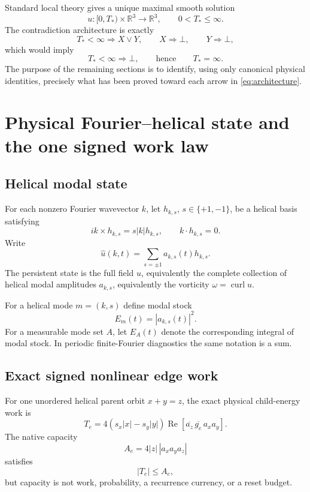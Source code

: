 \documentclass[11pt]{article}
\newcommand{\R}{\mathbb R}
\newcommand{\curl}{\operatorname{curl}}
\begin{document}
Standard local theory gives a unique maximal smooth solution
\[
u:[0,T_*)\times\R^3\to\R^3,
\qquad 0<T_*\le\infty.
\]
The contradiction architecture is exactly
\begin{equation}\label{eq:architecture}
\boxed{
T_*<\infty
\Longrightarrow X\vee Y,
\qquad
X\Longrightarrow\bot,
\qquad
Y\Longrightarrow\bot,
}
\end{equation}
which would imply
\[
T_*<\infty\Longrightarrow\bot,
\qquad\text{hence}\qquad T_*=\infty.
\]
The purpose of the remaining sections is to identify, using only canonical physical identities, precisely what has been proved toward each arrow in \eqref{eq:architecture}.

\section{Physical Fourier--helical state and the one signed work law}

\subsection{Helical modal state}

For each nonzero Fourier wavevector $k$, let $h_{k,s}$, $s\in\{+1,-1\}$, be a helical basis satisfying
\[
ik\times h_{k,s}=s|k|h_{k,s},
\qquad k\cdot h_{k,s}=0.
\]
Write
\[
\widehat u(k,t)=\sum_{s=\pm1}a_{k,s}(t)h_{k,s}.
\]
The persistent state is the full field $u$, equivalently the complete collection of helical modal amplitudes $a_{k,s}$, equivalently the vorticity $\omega=\curl u$.

For a helical mode $m=(k,s)$ define modal stock
\[
E_m(t)=|a_{k,s}(t)|^2.
\]
For a measurable mode set $A$, let $E_A(t)$ denote the corresponding integral of modal stock.  In periodic finite-Fourier diagnostics the same notation is a sum.

\subsection{Exact signed nonlinear edge work}

For one unordered helical parent orbit $x+y=z$, the exact physical child-energy work is
\begin{equation}\label{eq:edgework}
\boxed{
T_e
=4(s_x|x|-s_y|y|)
\operatorname{Re}\!\left[
\overline{a_z}\,\overline{g_e}\,a_xa_y
\right].
}
\end{equation}
The native capacity
\[
A_e=4|z|\,|a_xa_ya_z|
\]
satisfies
\[
|T_e|\le A_e,
\]
but capacity is not work, probability, a recurrence currency, or a reset budget.
\end{document}
